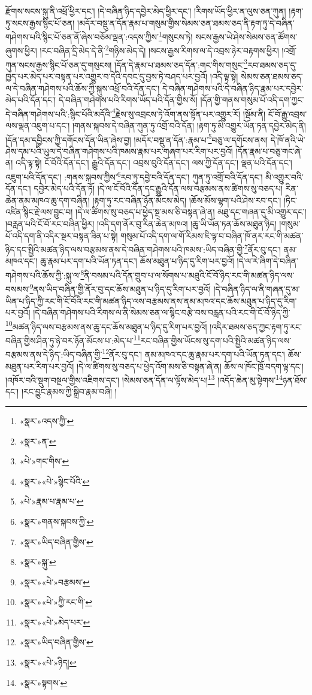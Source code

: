 རྫོགས་སངས་སྐུ་ནི་འཕྲོ་ཕྱིར་དང་། །དེ་བཞིན་ཉིད་དབྱེར་མེད་ཕྱིར་དང་། །རིགས་ཡོད་ཕྱིར་ན་ལུས་ཅན་ཀུན། །རྟག་ཏུ་སངས་རྒྱས་སྙིང་པོ་ཅན། །མདོར་བསྡུ་ན་དོན་རྣམ་པ་གསུམ་གྱིས་སེམས་ཅན་ཐམས་ཅད་ནི་རྟག་ཏུ་དེ་བཞིན་གཤེགས་པའི་སྙིང་པོ་ཅན་ནོ་ཞེས་བཅོམ་ལྡན་:འདས་ཀྱིས་\footnote{«སྣར་»འདས་ཀྱི་}གསུངས་ཏེ། སངས་རྒྱས་ཡེ་ཤེས་སེམས་ཅན་ཚོགས་ཞུགས་ཕྱིར། །རང་བཞིན་དྲི་མེད་དེ་ནི་\footnote{«སྣར་»ན་}གཉིས་མེད་དེ། །སངས་རྒྱས་རིགས་ལ་དེ་འབྲས་ཉེར་བརྟགས་ཕྱིར། །འགྲོ་ཀུན་སངས་རྒྱས་སྙིང་པོ་ཅན་དུ་གསུངས། །དོན་དེ་རྣམ་པ་ཐམས་ཅད་དོན་:གང་གིས་གསུང་\footnote{«པེ་»གང་གིས་}རབ་ཐམས་ཅད་དུ་ཁྱད་པར་མེད་པར་བསྟན་པར་འགྱུར་བ་དེའི་དབང་དུ་བྱས་ཏེ་བཤད་པར་བྱའོ། །འདི་ལྟ་སྟེ། སེམས་ཅན་ཐམས་ཅད་ལ་དེ་བཞིན་གཤེགས་པའི་ཆོས་ཀྱི་སྐུས་འཕྲོ་བའི་དོན་དང་། དེ་བཞིན་གཤེགས་པའི་དེ་བཞིན་ཉིད་རྣམ་པར་དབྱེར་མེད་པའི་དོན་དང་། དེ་བཞིན་གཤེགས་པའི་རིགས་ཡོད་པའི་དོན་གྱིས་སོ། །དོན་གྱི་གནས་གསུམ་པོ་འདི་དག་ཀྱང་དེ་བཞིན་གཤེགས་པའི་:སྙིང་པོའི་མདོའི་\footnote{«སྣར་»«པེ་»སྙིང་པོའི་}རྗེས་སུ་འབྲངས་ཏེ་འོག་ནས་སྟོན་པར་འགྱུར་རོ། །སྡོམ་ནི། ངོ་བོ་རྒྱུ་འབྲས་ལས་ལྡན་འཇུག་པ་དང་། །གནས་སྐབས་དེ་བཞིན་ཀུན་ཏུ་འགྲོ་བའི་དོན། །རྟག་ཏུ་མི་འགྱུར་ཡོན་ཏན་དབྱེར་མེད་ནི། །དོན་དམ་དབྱིངས་ཀྱི་དགོངས་དོན་ཡིན་ཞེས་བྱ། །མདོར་བསྡུ་ན་དོན་:རྣམ་པ་\footnote{«པེ་»རྣམ་པ་རྣམ་པ་}བཅུ་ལ་དགོངས་ནས། དེ་ཁོ་ནའི་ཡེ་ཤེས་དམ་པའི་ཡུལ་དེ་བཞིན་གཤེགས་པའི་ཁམས་རྣམ་པར་གཞག་པར་རིག་པར་བྱའོ། །དོན་རྣམ་པ་བཅུ་གང་ཞེ་ན། འདི་ལྟ་སྟེ། ངོ་བོའི་དོན་དང་། རྒྱུའི་དོན་དང་། འབྲས་བུའི་དོན་དང་། ལས་ཀྱི་དོན་དང་། ལྡན་པའི་དོན་དང་། འཇུག་པའི་དོན་དང་། :གནས་སྐབས་ཀྱིས་\footnote{«སྣར་»གནས་སྐབས་ཀྱི་}རབ་ཏུ་དབྱེ་བའི་དོན་དང་། ཀུན་ཏུ་འགྲོ་བའི་དོན་དང་། མི་འགྱུར་བའི་དོན་དང་། དབྱེར་མེད་པའི་དོན་ཏོ། །དེ་ལ་ངོ་བོའི་དོན་དང་རྒྱུའི་དོན་ལས་བརྩམས་ནས་ཚིགས་སུ་བཅད་པ། རིན་ཆེན་ནམ་མཁའ་ཆུ་དག་བཞིན། །རྟག་ཏུ་རང་བཞིན་ཉོན་མོངས་མེད། །ཆོས་མོས་ལྷག་པའི་ཤེས་རབ་དང་། །ཏིང་འཛིན་སྙིང་རྗེ་ལས་བྱུང་བ། །དེ་ལ་ཚིགས་སུ་བཅད་པ་ཕྱེད་སྔ་མས་ཅི་བསྟན་ཞེ་ན། མཐུ་དང་གཞན་དུ་མི་འགྱུར་དང་། །བརླན་པའི་ངོ་བོ་རང་བཞིན་ཕྱིར། །འདི་དག་ནོར་བུ་རིན་ཆེན་མཁའ། །ཆུ་ཡི་ཡོན་ཏན་ཆོས་མཐུན་ཉིད། །གསུམ་པོ་འདི་དག་ནི་འདིར་སྔར་བསྟན་ཟིན་པ་སྟེ། གསུམ་པོ་འདི་དག་ལ་གོ་རིམས་ཇི་ལྟ་བ་བཞིན་ཁོ་ནར་རང་གི་མཚན་ཉིད་དང་སྤྱིའི་མཚན་ཉིད་ལས་བརྩམས་ནས་དེ་བཞིན་གཤེགས་པའི་ཁམས་:ཡིད་བཞིན་གྱི་\footnote{«སྣར་»ཡིད་བཞིན་གྱིས་}ནོར་བུ་དང་། ནམ་མཁའ་དང་། ཆུ་རྣམ་པར་དག་པའི་ཡོན་ཏན་དང་། ཆོས་མཐུན་པ་ཉིད་དུ་རིག་པར་བྱའོ། །དེ་ལ་རེ་ཞིག་དེ་བཞིན་གཤེགས་པའི་ཆོས་ཀྱི་:སྐུ་ལ་\footnote{«སྣར་»སྐུ་}ནི་བསམ་པའི་དོན་གྲུབ་པ་ལ་སོགས་པ་མཐུའི་ངོ་བོ་ཉིད་རང་གི་མཚན་ཉིད་ལས་བསམས་\footnote{«སྣར་»«པེ་»བརྩམས་}ནས་ཡིད་བཞིན་གྱི་ནོར་བུ་དང་ཆོས་མཐུན་པ་ཉིད་དུ་རིག་པར་བྱའོ། །དེ་བཞིན་ཉིད་ལ་ནི་གཞན་དུ་མ་ཡིན་པ་ཉིད་ཀྱི་རང་གི་ངོ་བོའི་རང་གི་མཚན་ཉིད་ལས་བརྩམས་ནས་ནམ་མཁའ་དང་ཆོས་མཐུན་པ་ཉིད་དུ་རིག་པར་བྱའོ། །དེ་བཞིན་གཤེགས་པའི་རིགས་ལ་ནི་སེམས་ཅན་ལ་སྙིང་བརྩེ་བས་བརླན་པའི་རང་གི་ངོ་བོ་ཉིད་ཀྱི་\footnote{«སྣར་»«པེ་»ཀྱི་རང་གི་}མཚན་ཉིད་ལས་བརྩམས་ནས་ཆུ་དང་ཆོས་མཐུན་པ་ཉིད་དུ་རིག་པར་བྱའོ། །འདིར་ཐམས་ཅད་ཀྱང་རྟག་ཏུ་རང་བཞིན་གྱིས་ཤིན་ཏུ་ཉེ་བར་ཉོན་མོངས་པ་:མེད་པ་\footnote{«སྣར་»«པེ་»མེད་པར་}རང་བཞིན་གྱིས་ཡོངས་སུ་དག་པའི་སྤྱིའི་མཚན་ཉིད་ལས་བརྩམས་ནས་དེ་ཉིད་:ཡིད་བཞིན་གྱི་\footnote{«སྣར་»ཡིད་བཞིན་གྱིས་}ནོར་བུ་དང་། ནམ་མཁའ་དང་ཆུ་རྣམ་པར་དག་པའི་ཡོན་ཏན་དང་། ཆོས་མཐུན་པར་རིག་པར་བྱའོ། །དེ་ལ་ཚིགས་སུ་བཅད་པ་ཕྱེད་འོག་མས་ཅི་བསྟན་ཞེ་ན། ཆོས་ལ་ཁོང་ཁྲོ་བདག་ལྟ་དང་། །འཁོར་བའི་སྡུག་བསྔལ་གྱིས་འཇིགས་དང་། །སེམས་ཅན་དོན་ལ་ལྟོས་མེད་པ།\footnote{«སྣར་»«པེ་»ཉིད།} །འདོད་ཆེན་མུ་སྟེགས་\footnote{«སྣར་»སྟགས་}ཉན་ཐོས་དང་། །རང་བྱུང་རྣམས་ཀྱི་སྒྲིབ་རྣམ་བཞི། །
